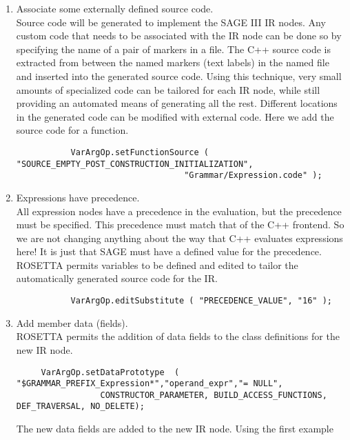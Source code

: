 \begin{enumerate}
     \item Associate some externally defined source code. \\
           Source code will be generated to implement the SAGE III IR nodes.  Any custom
           code that needs to be associated with the IR node can be done so by specifying 
           the name of a pair of markers in a file. The C++ source code is extracted 
           from between the named markers (text labels) in the named file and inserted 
           into the generated source code. Using this technique, very small amounts of 
           specialized code can be tailored for each IR node, while still providing an 
           automated means of generating all the rest.  Different locations in the
           generated code can be modified with external code. Here we add the source code
           for a function.
{\indent
{\mySmallFontSize
\begin{verbatim}
           VarArgOp.setFunctionSource ( "SOURCE_EMPTY_POST_CONSTRUCTION_INITIALIZATION", 
                                  "Grammar/Expression.code" );
\end{verbatim} 
}}
     \item Expressions have precedence. \\
           All expression nodes have a precedence in the evaluation, but the precedence must
           be specified.  This precedence must match that of the C++ frontend.  So we 
           are not changing anything about the way that C++ evaluates expressions here!
           It is just that SAGE must have a defined value for the precedence.
           ROSETTA permits variables to be defined and edited to tailor the automatically
           generated source code for the IR.
{\indent
{\mySmallFontSize
\begin{verbatim}
           VarArgOp.editSubstitute ( "PRECEDENCE_VALUE", "16" );
\end{verbatim} 
}}
     \item Add member data (fields). \\
           ROSETTA permits the addition of data fields to the class definitions for the
           new IR node.
{\indent
{\mySmallFontSize
\begin{verbatim}
     VarArgOp.setDataPrototype  ( "$GRAMMAR_PREFIX_Expression*","operand_expr","= NULL",
				 CONSTRUCTOR_PARAMETER, BUILD_ACCESS_FUNCTIONS, DEF_TRAVERSAL, NO_DELETE);
\end{verbatim}
}}
           The new data fields are added to the new IR node.  Using the first example

\end{enumerate}
